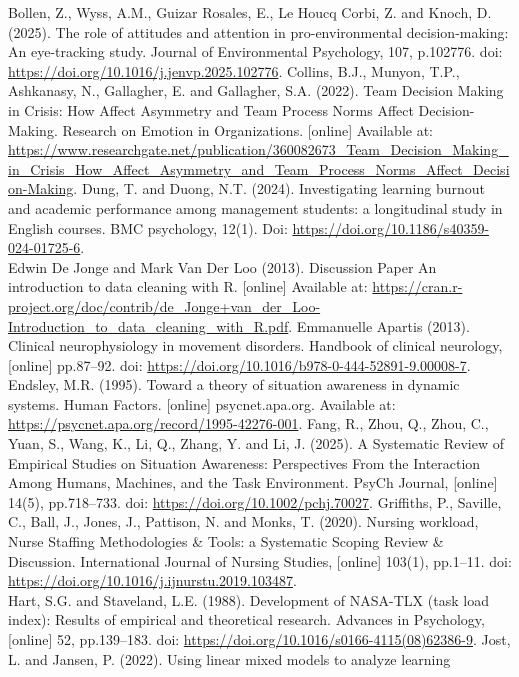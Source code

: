 \documentclass[
]{article}
\begin{document}
Bollen, Z., Wyss, A.M., Guizar Rosales, E., Le Houcq Corbi, Z. and
Knoch, D. (2025). The role of attitudes and attention in
pro-environmental decision-making: An eye-tracking study. Journal of
Environmental Psychology, 107, p.102776. doi:
\url{https://doi.org/10.1016/j.jenvp.2025.102776}. Collins, B.J.,
Munyon, T.P., Ashkanasy, N., Gallagher, E. and Gallagher, S.A. (2022).
Team Decision Making in Crisis: How Affect Asymmetry and Team Process
Norms Affect Decision-Making. Research on Emotion in Organizations.
{[}online{]} Available at:
\url{https://www.researchgate.net/publication/360082673_Team_Decision_Making_in_Crisis_How_Affect_Asymmetry_and_Team_Process_Norms_Affect_Decision-Making}.
Dung, T. and Duong, N.T. (2024). Investigating learning burnout and
academic performance among management students: a longitudinal study in
English courses. BMC psychology, 12(1). Doi:
\url{https://doi.org/10.1186/s40359-024-01725-6}.\\
Edwin De Jonge and Mark Van Der Loo (2013). Discussion Paper An
introduction to data cleaning with R. {[}online{]} Available at:
\url{https://cran.r-project.org/doc/contrib/de_Jonge+van_der_Loo-Introduction_to_data_cleaning_with_R.pdf}.
Emmanuelle Apartis (2013). Clinical neurophysiology in movement
disorders. Handbook of clinical neurology, {[}online{]} pp.87--92. doi:
\url{https://doi.org/10.1016/b978-0-444-52891-9.00008-7}. Endsley, M.R.
(1995). Toward a theory of situation awareness in dynamic systems. Human
Factors. {[}online{]} psycnet.apa.org. Available at:
\url{https://psycnet.apa.org/record/1995-42276-001}. Fang, R., Zhou, Q.,
Zhou, C., Yuan, S., Wang, K., Li, Q., Zhang, Y. and Li, J. (2025). A
Systematic Review of Empirical Studies on Situation Awareness:
Perspectives From the Interaction Among Humans, Machines, and the Task
Environment. PsyCh Journal, {[}online{]} 14(5), pp.718--733. doi:
\url{https://doi.org/10.1002/pchj.70027}. Griffiths, P., Saville, C.,
Ball, J., Jones, J., Pattison, N. and Monks, T. (2020). Nursing
workload, Nurse Staffing Methodologies \& Tools: a Systematic Scoping
Review \& Discussion. International Journal of Nursing Studies,
{[}online{]} 103(1), pp.1--11. doi:
\url{https://doi.org/10.1016/j.ijnurstu.2019.103487}.\\
Hart, S.G. and Staveland, L.E. (1988). Development of NASA-TLX (task
load index): Results of empirical and theoretical research. Advances in
Psychology, {[}online{]} 52, pp.139--183. doi:
\url{https://doi.org/10.1016/s0166-4115(08)62386-9}. Jost, L. and
Jansen, P. (2022). Using linear mixed models to analyze learning
\end{document}
